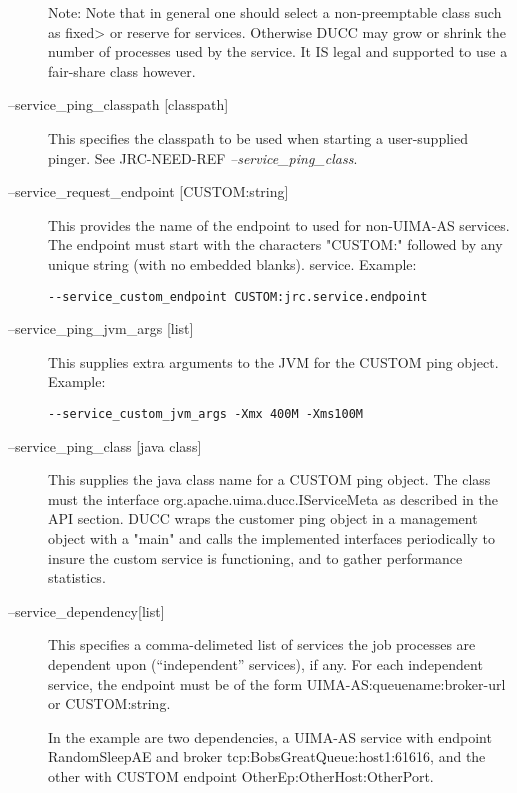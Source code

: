 \begin{description}
             Note: Note that in general one should select a non-preemptable class such as 
             fixed> or reserve for services. Otherwise DUCC may grow or shrink the number 
             of processes used by the service. It IS legal and supported to use a fair-share class 
             however. 

           \item[--service\_ping\_classpath {[classpath]}] This specifies the classpath to be used when
             starting a user-supplied pinger.  See JRC-NEED-REF {\em --service\_ping\_class}.

           \item[--service\_request\_endpoint {[CUSTOM:string]}] This provides the name of the endpoint
             to used for non-UIMA-AS services. The endpoint must start with the characters "CUSTOM:"
             followed by any unique string (with no embedded blanks).
             service. Example:
\begin{verbatim}
--service_custom_endpoint CUSTOM:jrc.service.endpoint 
\end{verbatim}
             
           \item[--service\_ping\_jvm\_args {[list]}] This supplies extra arguments to the JVM for the
             CUSTOM ping object. Example:
\begin{verbatim}
--service_custom_jvm_args -Xmx 400M -Xms100M 
\end{verbatim}
             
           \item[--service\_ping\_class {[java class]}] This supplies the java class name for a CUSTOM
             ping object. The class must the interface org.apache.uima.ducc.IServiceMeta as described in
             the API section. DUCC wraps the customer ping object in a management object with a "main"
             and calls the implemented interfaces periodically to insure the custom service is
             functioning, and to gather performance statistics. 
             
           \item[{--service\_dependency[list]}]
             This specifies a             
             comma-delimeted list of services the job processes are dependent upon (``independent''
             services), if any.  For each independent service, the endpoint must be of the form
             UIMA-AS:queuename:broker-url or CUSTOM:string.
             
             In the example are two dependencies, a UIMA-AS service with endpoint RandomSleepAE and broker
             tcp:BobsGreatQueue:host1:61616, and the other with CUSTOM endpoint
             OtherEp:OtherHost:OtherPort.
             

\end{description}
